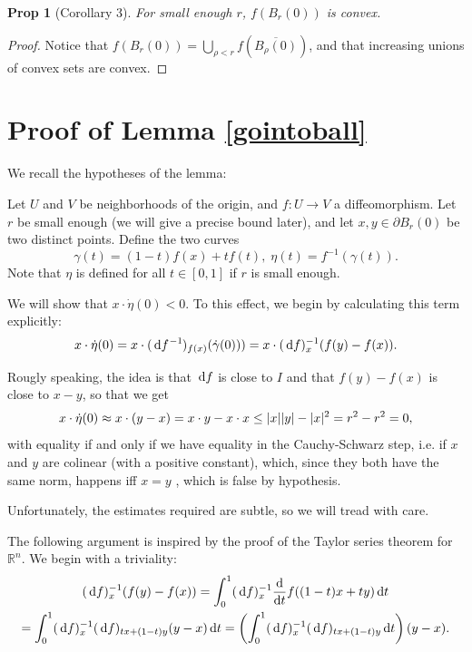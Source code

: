 \documentclass{article}
\newtheorem{prop}{Prop}
\theoremstyle{nonumberplain}
\newtheorem{proof}{Proof}
\newcommand{\R}{\mathbb{R}}
\DeclarePairedDelimiter{\norm}{\lvert}{\rvert}
\newcommand{\corthree}{Corollary 3}
\begin{document}
\begin{prop}[\corthree]
For small enough $r$, $f(B_r(0))$ is convex.
\end{prop}

\begin{proof}
Notice that $f(B_r(0)) = \bigcup_{\rho<r} f(\overline{B_\rho(0)})$, and that increasing unions of convex sets are convex.
\end{proof}

\section{Proof of Lemma \ref{gointoball}}

We recall the hypotheses of the lemma:

Let $U$ and $V$ be neighborhoods of the origin, and $f \colon U \to V$ a diffeomorphism. Let $r$ be small enough (we will give a precise bound later), and let $x, y \in \partial B_r(0)$ be two distinct points. Define the two curves
\[\gamma(t) = (1-t) f(x) + t f(t), \; \eta(t) = f^{-1}(\gamma(t)).\]
Note that $\eta$ is defined for all $t \in [0,1]$ if $r$ is small enough.

We will show that $x \cdot \dot \eta(0) < 0$. To this effect, we begin by calculating this term explicitly:
\[x \cdot \dot \eta(0) = x \cdot (\dl f^{-1})_{f(x)} (\dot \gamma(0)) ) = x \cdot (\dl f)_x^{-1} (f(y) - f(x)).\]

Rougly speaking, the idea is that $\dl f$ is close to $I$ and that $f(y)-f(x)$ is close to $x-y$, so that we get
\[x \cdot \dot \eta(0) \approx x \cdot (y-x) = x \cdot y - x \cdot x \leq \norm x \norm y - \norm x ^2 = r^2 - r^2 = 0,\]
with equality if and only if we have equality in the Cauchy-Schwarz step, i.e. if $x$ and $y$ are colinear (with a positive constant), which, since they both have the same norm, happens iff $x=y$ , which is false by hypothesis.

Unfortunately, the estimates required are subtle, so we will tread with care.

The following argument is inspired by the proof of the Taylor series theorem for $\R^n$. We begin with a triviality:
\begin{multline*}
(\dl f)_x^{-1} (f(y)-f(x)) = \int_0^1 (\dl f)_x^{-1} \diff*{f((1-t) x + t y)}t \dl t\\
= \int_0^1 (\dl f)_x^{-1} (\dl f)_{tx + (1-t)y} (y-x) \dl t = \left( \int_0^1 (\dl f)_x^{-1} (\dl f)_{tx + (1-t)y} \dl t \right) (y-x).
\end{multline*}
\end{document}
